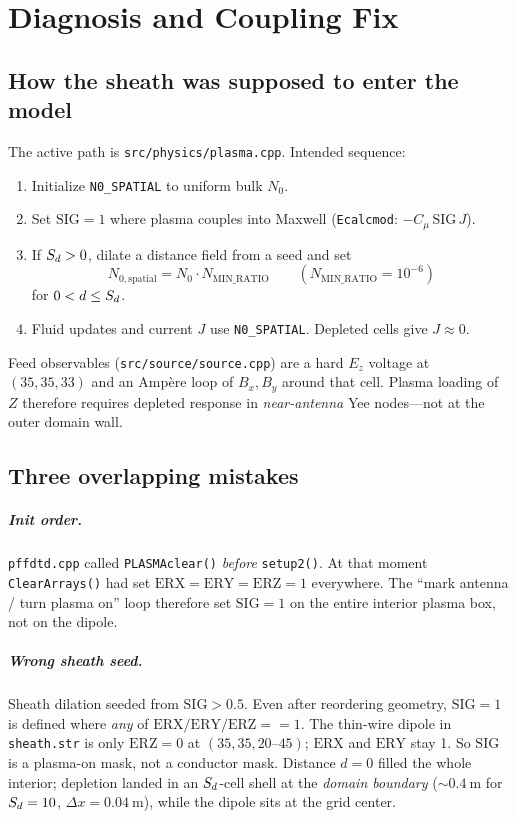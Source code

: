\chapter{Diagnosis and Coupling Fix}
\label{ch:fix}

\section{How the sheath was supposed to enter the model}

The active path is \texttt{src/physics/plasma.cpp}. Intended sequence:

\begin{enumerate}[leftmargin=1.5em]
\item Initialize \texttt{N0\_SPATIAL} to uniform bulk \(N_0\).
\item Set \(\mathrm{SIG}=1\) where plasma couples into Maxwell (\texttt{Ecalcmod}: \(-C_\mu\,\mathrm{SIG}\,J\)).
\item If \(S_d>0\), dilate a distance field from a seed and set
\[
N_{0,\mathrm{spatial}}=N_0\cdot N_{\mathrm{MIN\_RATIO}}
\qquad (N_{\mathrm{MIN\_RATIO}}=10^{-6})
\]
for \(0<d\le S_d\).
\item Fluid updates and current \(J\) use \texttt{N0\_SPATIAL}. Depleted cells give \(J\approx 0\).
\end{enumerate}

Feed observables (\texttt{src/source/source.cpp}) are a hard \(E_z\) voltage at \((35,35,33)\) and an Amp\`{e}re loop of \(B_x,B_y\) around that cell. Plasma loading of \(Z\) therefore requires depleted response in \emph{near-antenna} Yee nodes---not at the outer domain wall.

\section{Three overlapping mistakes}

\paragraph{Init order.}
\texttt{pffdtd.cpp} called \texttt{PLASMAclear()} \emph{before} \texttt{setup2()}. At that moment \texttt{ClearArrays()} had set \(\mathrm{ERX}=\mathrm{ERY}=\mathrm{ERZ}=1\) everywhere. The ``mark antenna / turn plasma on'' loop therefore set \(\mathrm{SIG}=1\) on the entire interior plasma box, not on the dipole.

\paragraph{Wrong sheath seed.}
Sheath dilation seeded from \(\mathrm{SIG}>0.5\). Even after reordering geometry, \(\mathrm{SIG}=1\) is defined where \emph{any} of \(\mathrm{ERX}/\mathrm{ERY}/\mathrm{ERZ}==1\). The thin-wire dipole in \texttt{sheath.str} is only \(\mathrm{ERZ}=0\) at \((35,35,20\text{--}45)\); \(\mathrm{ERX}\) and \(\mathrm{ERY}\) stay 1. So \(\mathrm{SIG}\) is a plasma-on mask, not a conductor mask. Distance \(d=0\) filled the whole interior; depletion landed in an \(S_d\)-cell shell at the \emph{domain boundary} (\(\sim\SI{0.4}{\meter}\) for \(S_d=10\), \(\Delta x=\SI{0.04}{\meter}\)), while the dipole sits at the grid center.

